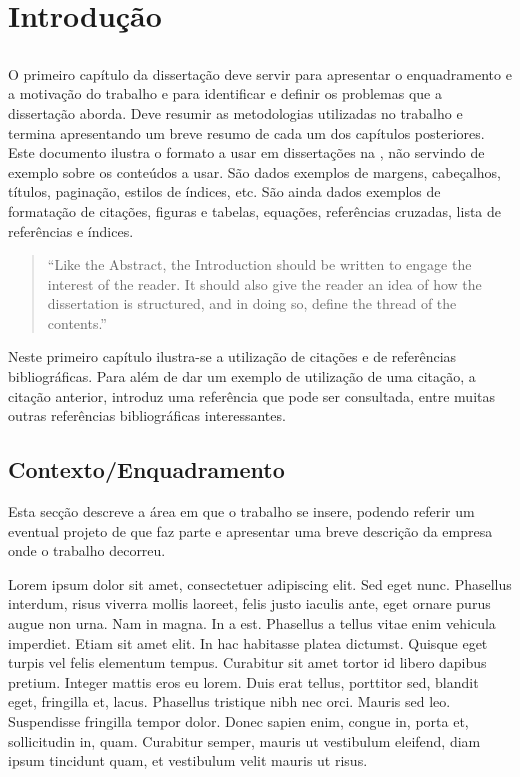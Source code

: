 
\chapter{Introdução} \label{chap:intro}

\section*{}

O primeiro capítulo da dissertação deve servir para apresentar o
enquadramento e a moti\-va\-ção do trabalho e para identificar e
definir os problemas que a dissertação aborda.
Deve resumir as metodologias utilizadas no trabalho e termina
apresentando um breve resumo de cada um dos capítulos
posteriores.
Este documento ilustra o formato a usar em dissertações na \Feup, não
servindo de exemplo sobre os conteúdos a usar.
São dados exemplos de margens, cabeçalhos, títulos, paginação, estilos
de índices, etc. 
São ainda dados exemplos de formatação de citações, figuras e tabelas,
equações, referências cruzadas, lista de referências e índices. 

\begin{quote}
  ``Like the Abstract, the Introduction should be written to engage the
  interest of the reader. It should also give the reader an idea of
  how the dissertation is structured, and in doing so, define the
  thread of the contents.'' 
\end{quote}

Neste primeiro capítulo ilustra-se a utilização de citações e de
referências biblio\-grá\-fi\-cas.
Para além de dar um exemplo de utilização de uma citação, a citação
anterior, introduz uma referência que pode ser consultada, entre
muitas outras referências bibliográficas
interessantes. 

\section{Contexto/Enquadramento} \label{sec:context}

Esta secção descreve a área em que o trabalho se insere, podendo
referir um eventual projeto de que faz parte e apresentar uma breve
descrição da empresa onde o trabalho decorreu.

Lorem ipsum dolor sit amet, consectetuer adipiscing
elit. 
Sed eget nunc. Phasellus interdum, risus viverra mollis laoreet, felis
justo iaculis ante, eget ornare purus augue non urna. Nam in magna. In a
est. Phasellus a tellus vitae enim vehicula imperdiet. Etiam sit amet
elit. In hac habitasse platea dictumst. Quisque eget turpis vel felis
elementum tempus. Curabitur sit amet tortor id libero dapibus
pretium. Integer mattis eros eu lorem. Duis erat tellus, porttitor
sed, blandit eget, fringilla et, lacus. Phasellus tristique nibh nec
orci. Mauris sed leo. Suspendisse fringilla tempor dolor. Donec sapien
enim, congue in, porta et, sollicitudin in, quam. Curabitur semper,
mauris ut vestibulum eleifend, diam ipsum tincidunt quam, et
vestibulum velit mauris ut risus. 

